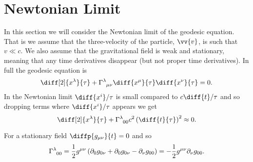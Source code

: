 \documentclass[fleqn]{NotesClass}
\newcommand*{\christoffel}[3]{\tensor{\Gamma}{^{#1}_{{#2}{#3}}}}
\begin{document}
    \section{Newtonian Limit}
    In this section we will consider the Newtonian limit of the geodesic equation.
    That is we assume that the three-velocity of the particle, \(\vv{v}\), is such that \(v \ll c\).
    We also assume that the gravitational field is weak and stationary, meaning that any time derivatives disappear (but not proper time derivatives).
    In full the geodesic equation is
    \begin{equation}
        \diff[2]{x^\lambda}{\tau} + \christoffel{\lambda}{\mu}{\nu} \diff{x^\mu}{\tau} \diff{x^\nu}{\tau} = 0.
    \end{equation}
    In the Newtonian limit \(\diff{x^i}/{\tau}\) is small compared to \(c\diff{t}/{\tau}\) and so dropping terms where \(\diff{x^i}/{\tau}\) appears we get
    \begin{equation}
        \diff[2]{x^\lambda}{\tau} + \christoffel{\lambda}{0}{0} c^2 \left( \diff{t}{\tau} \right)^2 \approx 0.
    \end{equation}
    
    For a stationary field \(\diffp{g_{\mu\nu}}{t} = 0\) and so
    \begin{equation}
        \christoffel{\lambda}{0}{0} = \frac{1}{2}g^{\mu\nu} \left( \partial_0 g_{0\nu} + \partial_0 g_{0\nu} - \partial_\nu g_{00} \right) = -\frac{1}{2}g^{\mu\nu}\partial_\nu g_{00}.
    \end{equation}
    
\end{document}
